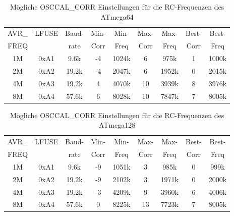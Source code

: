 \begin{table}[H]
  \begin{center}
    \begin{tabular}{| c | c | c || c | c || c | c || c | c |}
    \hline
             AVR\_ & LFUSE & Baud- & Min- & Min- & Max- & Max- & Best- & Best-  \\
             FREQ  &       & rate & Corr & Freq & Corr & Freq  & Corr  & Freq  \\
    \hline
    \hline
                1M & 0xA1  &  9.6k &  -4  & 1024k &  6  & 975k  & 1  & 1000k \\
    \hline
                2M & 0xA2  & 19.2k &  -4  & 2047k &  6  & 1952k & 0  & 2015k \\
    \hline
                4M & 0xA3  & 19.2k &   4  & 4070k & 10  & 3939k & 8  & 3976k \\
    \hline
                8M & 0xA4  & 57.6k &   6  & 8028k & 10  & 7847k & 7  & 8005k \\
    \hline
    \end{tabular}
  \end{center}
  \caption{Mögliche OSCCAL\_CORR Einstellungen für die RC-Frequenzen des ATmega64}
  \label{tab:mega64freq}
\end{table}

\begin{table}[H]
  \begin{center}
    \begin{tabular}{| c | c | c || c | c || c | c || c | c |}
    \hline
             AVR\_ & LFUSE & Baud- & Min- & Min- & Max- & Max- & Best- & Best-  \\
             FREQ  &       & rate & Corr & Freq & Corr & Freq  & Corr  & Freq  \\
    \hline
    \hline
                1M & 0xA1  &  9.6k &  -9  & 1051k &  3  & 985k  & 0  &  999k \\
    \hline
                2M & 0xA2  & 19.2k &  -9  & 2102k &  3  & 1971k & 0  & 2000k \\
    \hline
                4M & 0xA3  & 19.2k &  -3  & 4209k &  9  & 3960k & 6  & 4006k \\
    \hline
                8M & 0xA4  & 57.6k &   0  & 8225k & 13  & 7723k & 7  & 8005k \\
    \hline
    \end{tabular}
  \end{center}
  \caption{Mögliche OSCCAL\_CORR Einstellungen für die RC-Frequenzen des ATmega128}
  \label{tab:mega128freq}
\end{table}

